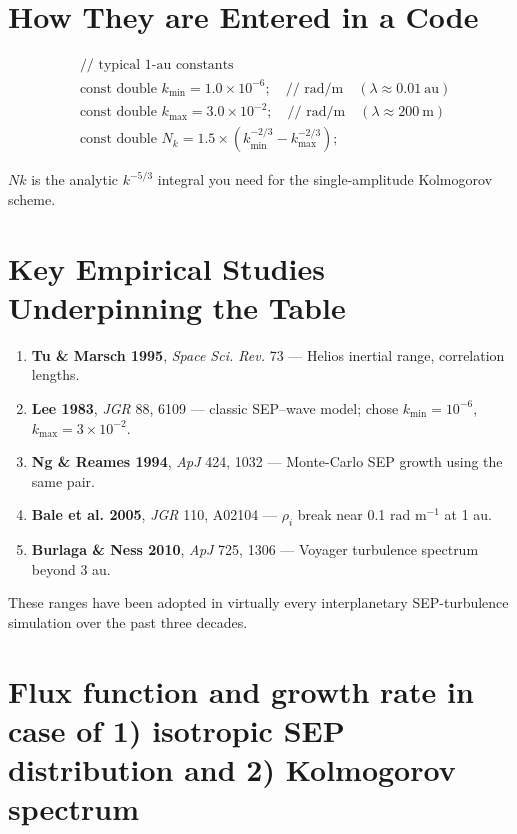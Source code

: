 \section*{How They are Entered in a Code}

\begin{align*}
&\text{// typical 1-au constants} \\
&\text{const double } k_{\min} = 1.0 \times 10^{-6};\quad \text{// rad/m}\quad (\lambda \approx 0.01\ \text{au}) \\
&\text{const double } k_{\max} = 3.0 \times 10^{-2};\quad \text{// rad/m}\quad (\lambda \approx 200\ \text{m}) \\
&\text{const double } N_k = 1.5 \times \left( k_{\min}^{-2/3} - k_{\max}^{-2/3} \right);
\end{align*}

\noindent$Nk$ is the analytic $k^{-5/3}$ integral you need for the single-amplitude Kolmogorov scheme.

\section*{Key Empirical Studies Underpinning the Table}

\begin{enumerate}
    \item \textbf{Tu \& Marsch 1995}, \textit{Space Sci. Rev.} 73 --- Helios inertial range, correlation lengths.
    \item \textbf{Lee 1983}, \textit{JGR} 88, 6109 --- classic SEP--wave model; chose $k_{\min} = 10^{-6}$, $k_{\max} = 3 \times 10^{-2}$.
    \item \textbf{Ng \& Reames 1994}, \textit{ApJ} 424, 1032 --- Monte-Carlo SEP growth using the same pair.
    \item \textbf{Bale et al. 2005}, \textit{JGR} 110, A02104 --- $\rho_i$ break near 0.1 rad m$^{-1}$ at 1 au.
    \item \textbf{Burlaga \& Ness 2010}, \textit{ApJ} 725, 1306 --- Voyager turbulence spectrum beyond 3 au.
\end{enumerate}

\noindent These ranges have been adopted in virtually every interplanetary SEP-turbulence simulation over the past three decades.




\section{Flux function and growth rate in case of 1) isotropic SEP distribution and 2) Kolmogorov spectrum}

